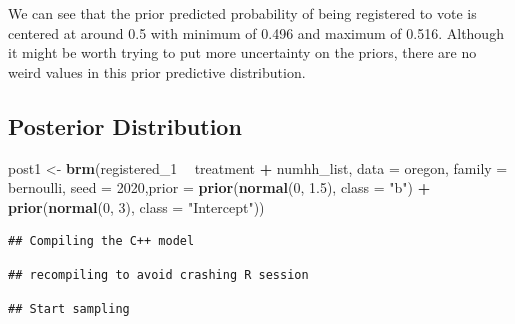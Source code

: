\documentclass[]{article}
\newenvironment{Shaded}{\begin{snugshade}}{\end{snugshade}}
\newcommand{\DataTypeTok}[1]{\textcolor[rgb]{0.13,0.29,0.53}{#1}}
\newcommand{\DecValTok}[1]{\textcolor[rgb]{0.00,0.00,0.81}{#1}}
\newcommand{\FloatTok}[1]{\textcolor[rgb]{0.00,0.00,0.81}{#1}}
\newcommand{\KeywordTok}[1]{\textcolor[rgb]{0.13,0.29,0.53}{\textbf{#1}}}
\newcommand{\NormalTok}[1]{#1}
\newcommand{\OperatorTok}[1]{\textcolor[rgb]{0.81,0.36,0.00}{\textbf{#1}}}
\newcommand{\StringTok}[1]{\textcolor[rgb]{0.31,0.60,0.02}{#1}}
\begin{document}
We can see that the prior predicted probability of being registered to
vote is centered at around 0.5 with minimum of 0.496 and maximum of
0.516. Although it might be worth trying to put more uncertainty on the
priors, there are no weird values in this prior predictive distribution.

\hypertarget{posterior-distribution}{%
\subsection{Posterior Distribution}\label{posterior-distribution}}

\begin{Shaded}
\begin{Highlighting}[]
\NormalTok{post1 <-}\StringTok{ }\KeywordTok{brm}\NormalTok{(registered_}\DecValTok{1} \OperatorTok{~}\StringTok{ }\NormalTok{treatment }\OperatorTok{+}\StringTok{ }\NormalTok{numhh_list, }\DataTypeTok{data =}\NormalTok{ oregon, }\DataTypeTok{family =}\NormalTok{ bernoulli, }\DataTypeTok{seed =} \DecValTok{2020}\NormalTok{,}\DataTypeTok{prior =} 
               \KeywordTok{prior}\NormalTok{(}\KeywordTok{normal}\NormalTok{(}\DecValTok{0}\NormalTok{, }\FloatTok{1.5}\NormalTok{), }\DataTypeTok{class =} \StringTok{"b"}\NormalTok{) }\OperatorTok{+}\StringTok{ }
\StringTok{               }\KeywordTok{prior}\NormalTok{(}\KeywordTok{normal}\NormalTok{(}\DecValTok{0}\NormalTok{, }\DecValTok{3}\NormalTok{), }\DataTypeTok{class =} \StringTok{"Intercept"}\NormalTok{))}
\end{Highlighting}
\end{Shaded}

\begin{verbatim}
## Compiling the C++ model
\end{verbatim}

\begin{verbatim}
## recompiling to avoid crashing R session
\end{verbatim}

\begin{verbatim}
## Start sampling
\end{verbatim}
\end{document}
